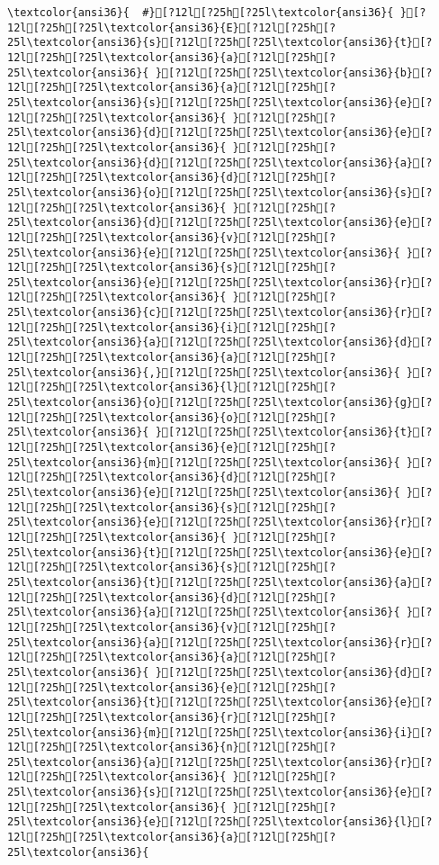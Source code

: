 \documentclass{scrartcl}
\begin{document}
\begin{Verbatim}
\textcolor{ansi36}{  #}[?12l[?25h[?25l\textcolor{ansi36}{ }[?12l[?25h[?25l\textcolor{ansi36}{E}[?12l[?25h[?25l\textcolor{ansi36}{s}[?12l[?25h[?25l\textcolor{ansi36}{t}[?12l[?25h[?25l\textcolor{ansi36}{a}[?12l[?25h[?25l\textcolor{ansi36}{ }[?12l[?25h[?25l\textcolor{ansi36}{b}[?12l[?25h[?25l\textcolor{ansi36}{a}[?12l[?25h[?25l\textcolor{ansi36}{s}[?12l[?25h[?25l\textcolor{ansi36}{e}[?12l[?25h[?25l\textcolor{ansi36}{ }[?12l[?25h[?25l\textcolor{ansi36}{d}[?12l[?25h[?25l\textcolor{ansi36}{e}[?12l[?25h[?25l\textcolor{ansi36}{ }[?12l[?25h[?25l\textcolor{ansi36}{d}[?12l[?25h[?25l\textcolor{ansi36}{a}[?12l[?25h[?25l\textcolor{ansi36}{d}[?12l[?25h[?25l\textcolor{ansi36}{o}[?12l[?25h[?25l\textcolor{ansi36}{s}[?12l[?25h[?25l\textcolor{ansi36}{ }[?12l[?25h[?25l\textcolor{ansi36}{d}[?12l[?25h[?25l\textcolor{ansi36}{e}[?12l[?25h[?25l\textcolor{ansi36}{v}[?12l[?25h[?25l\textcolor{ansi36}{e}[?12l[?25h[?25l\textcolor{ansi36}{ }[?12l[?25h[?25l\textcolor{ansi36}{s}[?12l[?25h[?25l\textcolor{ansi36}{e}[?12l[?25h[?25l\textcolor{ansi36}{r}[?12l[?25h[?25l\textcolor{ansi36}{ }[?12l[?25h[?25l\textcolor{ansi36}{c}[?12l[?25h[?25l\textcolor{ansi36}{r}[?12l[?25h[?25l\textcolor{ansi36}{i}[?12l[?25h[?25l\textcolor{ansi36}{a}[?12l[?25h[?25l\textcolor{ansi36}{d}[?12l[?25h[?25l\textcolor{ansi36}{a}[?12l[?25h[?25l\textcolor{ansi36}{,}[?12l[?25h[?25l\textcolor{ansi36}{ }[?12l[?25h[?25l\textcolor{ansi36}{l}[?12l[?25h[?25l\textcolor{ansi36}{o}[?12l[?25h[?25l\textcolor{ansi36}{g}[?12l[?25h[?25l\textcolor{ansi36}{o}[?12l[?25h[?25l\textcolor{ansi36}{ }[?12l[?25h[?25l\textcolor{ansi36}{t}[?12l[?25h[?25l\textcolor{ansi36}{e}[?12l[?25h[?25l\textcolor{ansi36}{m}[?12l[?25h[?25l\textcolor{ansi36}{ }[?12l[?25h[?25l\textcolor{ansi36}{d}[?12l[?25h[?25l\textcolor{ansi36}{e}[?12l[?25h[?25l\textcolor{ansi36}{ }[?12l[?25h[?25l\textcolor{ansi36}{s}[?12l[?25h[?25l\textcolor{ansi36}{e}[?12l[?25h[?25l\textcolor{ansi36}{r}[?12l[?25h[?25l\textcolor{ansi36}{ }[?12l[?25h[?25l\textcolor{ansi36}{t}[?12l[?25h[?25l\textcolor{ansi36}{e}[?12l[?25h[?25l\textcolor{ansi36}{s}[?12l[?25h[?25l\textcolor{ansi36}{t}[?12l[?25h[?25l\textcolor{ansi36}{a}[?12l[?25h[?25l\textcolor{ansi36}{d}[?12l[?25h[?25l\textcolor{ansi36}{a}[?12l[?25h[?25l\textcolor{ansi36}{ }[?12l[?25h[?25l\textcolor{ansi36}{v}[?12l[?25h[?25l\textcolor{ansi36}{a}[?12l[?25h[?25l\textcolor{ansi36}{r}[?12l[?25h[?25l\textcolor{ansi36}{a}[?12l[?25h[?25l\textcolor{ansi36}{ }[?12l[?25h[?25l\textcolor{ansi36}{d}[?12l[?25h[?25l\textcolor{ansi36}{e}[?12l[?25h[?25l\textcolor{ansi36}{t}[?12l[?25h[?25l\textcolor{ansi36}{e}[?12l[?25h[?25l\textcolor{ansi36}{r}[?12l[?25h[?25l\textcolor{ansi36}{m}[?12l[?25h[?25l\textcolor{ansi36}{i}[?12l[?25h[?25l\textcolor{ansi36}{n}[?12l[?25h[?25l\textcolor{ansi36}{a}[?12l[?25h[?25l\textcolor{ansi36}{r}[?12l[?25h[?25l\textcolor{ansi36}{ }[?12l[?25h[?25l\textcolor{ansi36}{s}[?12l[?25h[?25l\textcolor{ansi36}{e}[?12l[?25h[?25l\textcolor{ansi36}{ }[?12l[?25h[?25l\textcolor{ansi36}{e}[?12l[?25h[?25l\textcolor{ansi36}{l}[?12l[?25h[?25l\textcolor{ansi36}{a}[?12l[?25h[?25l\textcolor{ansi36}{ 
\end{Verbatim}
\end{document}
